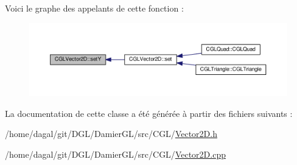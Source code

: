 Voici le graphe des appelants de cette fonction \-:
\nopagebreak
\begin{figure}[H]
\begin{center}
\leavevmode
\includegraphics[width=350pt]{d8/d97/class_c_g_l_vector2_d_a4c89a21e28a86848c6b023ad60baef4c_icgraph}
\end{center}
\end{figure}




La documentation de cette classe a été générée à partir des fichiers suivants \-:\begin{DoxyCompactItemize}
\item 
/home/dagal/git/\-D\-G\-L/\-Damier\-G\-L/src/\-C\-G\-L/\hyperlink{_vector2_d_8h}{Vector2\-D.\-h}\item 
/home/dagal/git/\-D\-G\-L/\-Damier\-G\-L/src/\-C\-G\-L/\hyperlink{_vector2_d_8cpp}{Vector2\-D.\-cpp}\end{DoxyCompactItemize}

